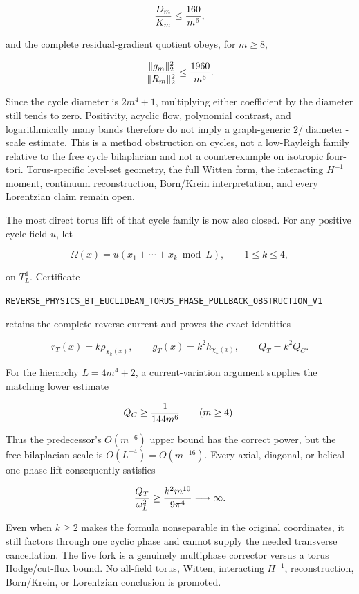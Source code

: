 \documentclass[11pt]{article}
\theoremstyle{definition}
\theoremstyle{remark}
\newcommand{\cert}[1]{\nolinkurl{#1}}
\begin{document}
\[
 {D_m\over K_m}\leq {160\over m^6},
\]

and the complete residual-gradient quotient obeys, for \(m\geq8\),

\[
 {\|g_m\|_2^2\over\|R_m\|_2^2}\leq {1960\over m^6}.
\]

Since the cycle diameter is \(2m^4+1\), multiplying either coefficient by
the diameter still tends to zero.  Positivity, acyclic flow, polynomial
contrast, and logarithmically many bands therefore do not imply a
graph-generic \(2/\operatorname{diameter}\)-scale estimate.  This is a method
obstruction on cycles, not a low-Rayleigh family relative to the free cycle
bilaplacian and not a counterexample on isotropic four-tori.  Torus-specific
level-set geometry, the full Witten form, the interacting \(H^{-1}\) moment,
continuum reconstruction, Born/Krein interpretation, and every Lorentzian
claim remain open.

The most direct torus lift of that cycle family is now also closed.  For any
positive cycle field \(u\), let

\[
 \Omega(x)=u(x_1+\cdots+x_k\bmod L),\qquad 1\leq k\leq4,
\]

on \(T_L^4\).  Certificate

\cert{REVERSE_PHYSICS_BT_EUCLIDEAN_TORUS_PHASE_PULLBACK_OBSTRUCTION_V1}

retains the complete reverse current and proves the exact identities

\[
 r_T(x)=k\rho_{\chi_k(x)},\qquad
 g_T(x)=k^2h_{\chi_k(x)},\qquad Q_T=k^2Q_C.
\]

For the hierarchy \(L=4m^4+2\), a current-variation argument supplies the
matching lower estimate

\[
 Q_C\geq {1\over144m^6}\qquad(m\geq4).
\]

Thus the predecessor's \(O(m^{-6})\) upper bound has the correct power, but
the free bilaplacian scale is \(O(L^{-4})=O(m^{-16})\).  Every axial,
diagonal, or helical one-phase lift consequently satisfies

\[
 {Q_T\over\omega_L^2}\geq {k^2m^{10}\over9\pi^4}\longrightarrow\infty.
\]

Even when \(k\geq2\) makes the formula nonseparable in the original
coordinates, it still factors through one cyclic phase and cannot supply the
needed transverse cancellation.  The live fork is a genuinely multiphase
corrector versus a torus Hodge/cut-flux bound.  No all-field torus, Witten,
interacting \(H^{-1}\), reconstruction, Born/Krein, or Lorentzian conclusion
is promoted.
\end{document}
